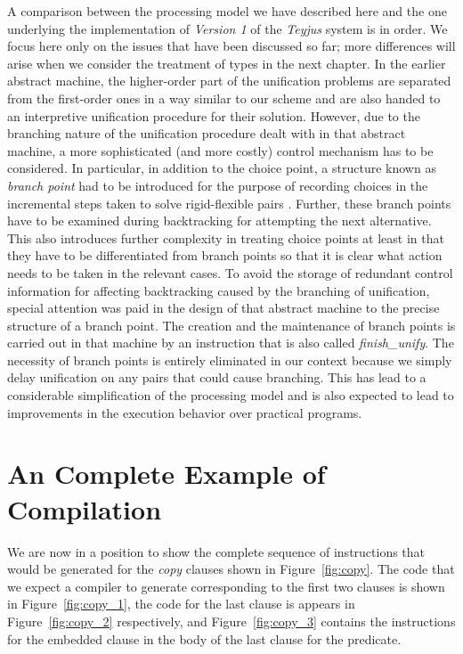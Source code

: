 A comparison between the processing model we have described here and
the one underlying the implementation of {\it Version 1} of the {\it
  Teyjus} system is in order. We focus here only on the issues that
have been discussed so far; more differences will arise when we
consider the treatment of types in the next chapter.
In the earlier abstract machine, the higher-order part of the
unification problems are separated from the first-order ones in a way similar
to our scheme and are also handed to an interpretive unification
procedure for their solution.
However, due to the branching nature of the unification procedure
dealt with in that abstract machine, a more sophisticated (and more
costly) control mechanism has to be considered. In particular, in
addition to the choice point, a
structure known as {\it branch point} had to be introduced for the
purpose of recording choices in the incremental steps taken to solve
rigid-flexible pairs \cite{N03treatment}. Further, these branch points
have to be
examined during backtracking for attempting the next alternative. This
also introduces further complexity in treating choice points at least
in that they have to be differentiated from branch points so that it
is clear what action needs to be taken in the relevant cases.
To avoid the storage of redundant control information for affecting
backtracking caused by the
branching of unification, special attention was paid in the design of
that abstract machine to the precise structure of a branch point.
The creation and the maintenance of branch points is carried out in
that machine by an instruction that is also called {\it finish\_unify}.
The necessity of branch points is entirely eliminated
in our context because we simply delay unification on any pairs that
could cause branching. This has lead to a considerable simplification
of the processing model and is also expected to lead to improvements
in the execution behavior over practical  programs.

\section{An Complete Example of Compilation}\label{sec:inst_exp}
We are now in a position to show the complete sequence of instructions
that would be generated for the {\it copy} clauses shown in
Figure~\ref{fig:copy}. The code that we expect a compiler to generate
corresponding to the first two clauses is shown in
Figure~\ref{fig:copy_1}, the code for the last clause is appears in
Figure~\ref{fig:copy_2} respectively, and Figure~\ref{fig:copy_3}
contains the instructions for the embedded clause in the body of the
last clause for the predicate.

